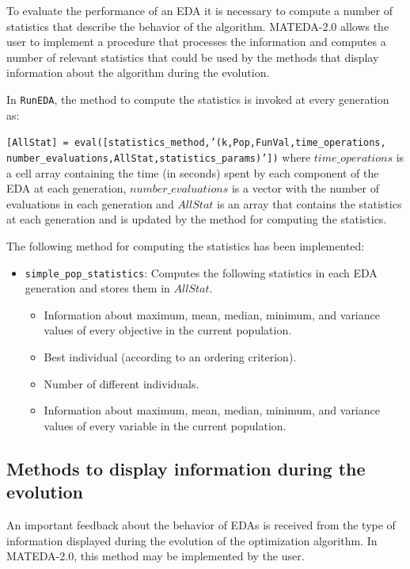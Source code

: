 \documentclass[a4paper]{article}
\begin{document}
 To evaluate the performance of an EDA it is necessary to compute a
 number of statistics that describe the behavior of the algorithm.
 MATEDA-2.0 allows the user to implement a procedure that processes
 the information and computes a number of relevant statistics that
 could be used by the methods that display information about the
 algorithm during the evolution.

In  \texttt{RunEDA}, the method to compute the statistics  is
invoked at every generation as:

  \texttt{[AllStat] = eval([statistics\_method,'(k,Pop,FunVal,time\_operations,\\
  number\_evaluations,AllStat,statistics\_params)'])}
where $time\_operations$ is a cell array containing the time (in
seconds) spent by each component of the EDA at each generation,
$number\_evaluations$ is a vector with the number of evaluations in
each generation and  $AllStat$ is an array that contains the
statistics at each generation and is updated by the method for
computing the statistics.

The following method for computing the statistics  has been
implemented:

\begin{itemize}
 \item \texttt{simple\_pop\_statistics}:  Computes the following statistics in
 each EDA
 generation and stores them in $AllStat$.
  \begin{itemize}
   \item   Information about maximum, mean, median, minimum, and variance values of
every objective in the current population.
    \item  Best individual (according to an ordering criterion).
    \item  Number of different individuals.
    \item Information about maximum, mean, median, minimum, and variance values of
every variable in the current population.
  \end{itemize}

\end{itemize}


\subsection{Methods to display information during the evolution}

  An important feedback about the behavior of EDAs is received from
  the type of
  information displayed during the evolution of the optimization algorithm. In
  MATEDA-2.0, this method may be implemented by the user.
\end{document}
